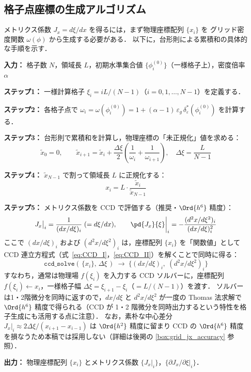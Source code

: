 \subsection{格子点座標の生成アルゴリズム}
\label{sec:grid_gen}

メトリクス係数 $J_x = d\xi/dx$ を得るには，まず物理座標配列 $\{x_i\}$ を
グリッド密度関数 $\omega(\phi)$ から生成する必要がある．
以下に，台形則による累積和の具体的な手順を示す．

\begin{tcolorbox}[resultbox, title={1次元格子点座標の構成}]
\textbf{入力：} 格子数 $N$，領域長 $L$，初期水準集合値 $\{\phi^{(0)}_i\}$（一様格子上），密度倍率 $\alpha$

\textbf{ステップ1：} 一様計算格子 $\xi_i = iL/(N-1)$（$i=0,1,\ldots,N-1$）を定義する．

\textbf{ステップ2：} 各格子点で $\omega_i = \omega(\phi^{(0)}_i) = 1 + (\alpha-1)\,\varepsilon_g\,\delta_\varepsilon^*(\phi^{(0)}_i)$ を計算する．

\textbf{ステップ3：} 台形則で累積和を計算し，物理座標の「未正規化」値を求める：
\[
  \tilde{x}_0 = 0, \qquad
  \tilde{x}_{i+1} = \tilde{x}_i + \frac{\Delta\xi}{2}\left(\frac{1}{\omega_i} + \frac{1}{\omega_{i+1}}\right),
  \quad \Delta\xi = \frac{L}{N-1}
\]

\textbf{ステップ4：} $\tilde{x}_{N-1}$ で割って領域長 $L$ に正規化する：
\[
  x_i = L \cdot \frac{\tilde{x}_i}{\tilde{x}_{N-1}}
\]

\textbf{ステップ5：} メトリクス係数を CCD で評価する（推奨・$\Ord{h^6}$ 精度）：
\[
  J_x\big|_i = \frac{1}{(dx/d\xi)_i} \;(= d\xi/dx), \qquad
  \pd{J_x}{\xi}\bigg|_i = -\frac{(d^2x/d\xi^2)_i}{(dx/d\xi)_i^2}
\]
ここで $(dx/d\xi)_i$ および $(d^2x/d\xi^2)_i$ は，座標配列 $\{x_i\}$ を「関数値」として
CCD 連立方程式（式~\eqref{eq:CCD_I}，\eqref{eq:CCD_II}）を解くことで同時に得る：
\[
  \texttt{ccd\_solve}(\,\{x_i\},\,\Delta\xi\,) \;\to\; \bigl\{(dx/d\xi)_i,\;(d^2x/d\xi^2)_i\bigr\}
\]
すなわち，通常は物理場 $f(\xi_i)$ を入力する CCD ソルバーに，座標配列 $f(\xi_i) \leftarrow x_i$，一様格子幅 $\Delta\xi = \xi_{i+1}-\xi_i$（$= L/(N-1)$）を渡す．
ソルバーは1・2階微分を同時に返すので，$dx/d\xi$ と $d^2x/d\xi^2$ が一度の Thomas 法求解で $\Ord{h^6}$ 精度で得られる（CCD が 1・2 階微分を同時出力するという特性を格子生成にも活用する点に注意）．
なお，素朴な中心差分 $J_x|_i \approx 2\Delta\xi/(x_{i+1}-x_{i-1})$ は $\Ord{h^2}$ 精度に留まり
CCD の $\Ord{h^6}$ 精度を損なうため本稿では採用しない（詳細は後掲の \ref{box:grid_jx_accuracy} 参照）．

\textbf{出力：} 物理座標配列 $\{x_i\}$ とメトリクス係数 $\{J_x|_i\}$，$\{\partial J_x/\partial\xi|_i\}$．
\end{tcolorbox}

